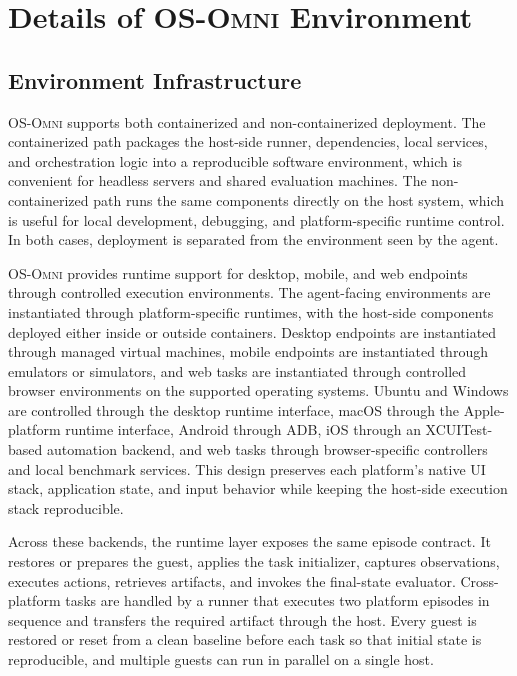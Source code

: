 \section{Details of \textsc{OS-Omni} Environment}
\label{app:osomni_env}

\subsection{Environment Infrastructure}
\label{app:osomni_env_infra}

\textsc{OS-Omni} supports both containerized and non-containerized deployment. The containerized path packages the host-side runner, dependencies, local services, and orchestration logic into a reproducible software environment, which is convenient for headless servers and shared evaluation machines. The non-containerized path runs the same components directly on the host system, which is useful for local development, debugging, and platform-specific runtime control. In both cases, deployment is separated from the environment seen by the agent.

\textsc{OS-Omni} provides runtime support for desktop, mobile, and web endpoints through controlled execution environments. The agent-facing environments are instantiated through platform-specific runtimes, with the host-side components deployed either inside or outside containers. Desktop endpoints are instantiated through managed virtual machines, mobile endpoints are instantiated through emulators or simulators, and web tasks are instantiated through controlled browser environments on the supported operating systems. Ubuntu and Windows are controlled through the desktop runtime interface, macOS through the Apple-platform runtime interface, Android through ADB, iOS through an XCUITest-based automation backend, and web tasks through browser-specific controllers and local benchmark services. This design preserves each platform's native UI stack, application state, and input behavior while keeping the host-side execution stack reproducible.

Across these backends, the runtime layer exposes the same episode contract. It restores or prepares the guest, applies the task initializer, captures observations, executes actions, retrieves artifacts, and invokes the final-state evaluator. Cross-platform tasks are handled by a runner that executes two platform episodes in sequence and transfers the required artifact through the host. Every guest is restored or reset from a clean baseline before each task so that initial state is reproducible, and multiple guests can run in parallel on a single host.

